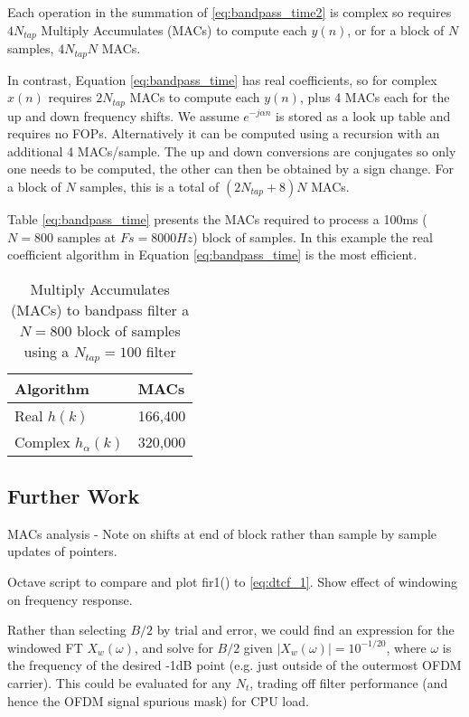 \documentclass{article}
\begin{document}
Each operation in the summation of \ref{eq:bandpass_time2} is complex so requires $4N_{tap}$ Multiply Accumulates (MACs) to compute each $y(n)$, or for a block of $N$ samples, $4N_{tap}N$ MACs.

In contrast, Equation \ref{eq:bandpass_time} has real coefficients, so for complex $x(n)$ requires $2N_{tap}$ MACs to compute each $y(n)$, plus 4 MACs each for the up and down frequency shifts. We assume $e^{-j \alpha n}$ is stored as a look up table and requires no FOPs. Alternatively it can be computed using a recursion with an additional 4 MACs/sample. The up and down conversions are conjugates so only one needs to be computed, the other can then be obtained by a sign change. For a block of $N$ samples, this is a total of $(2N_{tap}+8)N$ MACs.

Table \ref{eq:bandpass_time} presents the MACs required to process a 100ms ($N=800$ samples at $Fs=8000 Hz$) block of samples.  In this example the real coefficient algorithm in Equation \ref{eq:bandpass_time} is the most efficient.

\begin{table}[h]
\centering
\begin{tabular}{l l }
 \hline
 Algorithm & MACs \\
 \hline
 Real $h(k)$ & 166,400 \\
 Complex $h_{\alpha}(k)$  & 320,000 \\ 
 \hline
\end{tabular}
\caption{Multiply Accumulates (MACs) to bandpass filter a $N=800$ block of samples using a $N_{tap}=100$ filter}
\label{table:ratek1_mean_E}
\end{table}

\subsection {Further Work}

MACs analysis - Note on shifts at end of block rather than sample by sample updates of pointers.

Octave script to compare and plot fir1() to \ref{eq:dtcf_1}. Show effect of windowing on frequency response.

Rather than selecting $B/2$ by trial and error, we could find an expression for the windowed FT $X_w(\omega)$, and solve for $B/2$ given $|X_w(\omega)|=10^{-1/20}$, where $\omega$ is the frequency of the desired -1dB point (e.g. just outside of the outermost OFDM carrier).  This could be evaluated for any $N_t$, trading off filter performance (and hence the OFDM signal spurious mask) for CPU load.  



\end{document}
